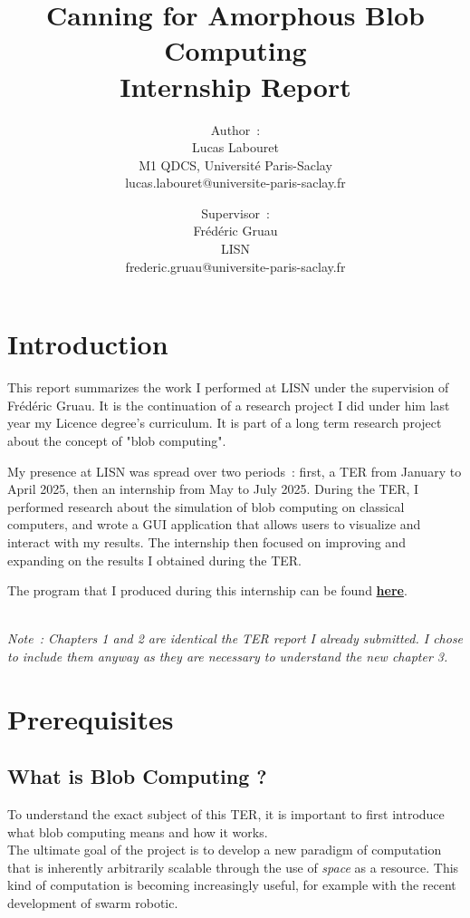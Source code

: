 \documentclass{report}
\title{
	Canning for Amorphous Blob Computing\\
	\small Internship Report
}
\author{
    Author~:\\
    Lucas Labouret\\
    M1 QDCS, Université Paris-Saclay\\
    \small lucas.labouret@universite-paris-saclay.fr
    \and
    Supervisor~:\\
    Frédéric Gruau\\
    LISN\\
    \small frederic.gruau@universite-paris-saclay.fr
}
\date{}
\begin{document}
 
\maketitle

\newpage
\tableofcontents
\newpage

\chapter*{Introduction}
\label{introduction}

This report summarizes the work I performed at LISN under the supervision of Frédéric Gruau. It is the continuation of a research project I did under him last year  my Licence degree's curriculum. It is part of a long term research project about the concept of "blob computing"\supercite{blob_computing1}. 

My presence at LISN was spread over two periods~: first, a TER from January to April 2025, then an internship from May to July 2025.
During the TER, I performed research about the simulation of blob computing on classical computers, and wrote a GUI application that allows users to visualize and interact with my results.
The internship then focused on improving and expanding on the results I obtained during the TER.

The program that I produced during this internship can be found \href{https://github.com/Lucas-Labouret/MilieuCalcul}{\textbf{here}}.

$ $\\
\small\textit{Note~: Chapters 1 and 2 are identical the TER report I already submitted. I chose to include them anyway as they are necessary to understand the new chapter 3.}

\chapter{Prerequisites}

\section{What is Blob Computing ?}

To understand the exact subject of this TER, it is important to first introduce what blob computing means and how it works.\\

The ultimate goal of the project is to develop a new paradigm of computation that is inherently arbitrarily scalable through the use of \textit{space} as a resource. This kind of computation is becoming increasingly useful, for example with the recent development of swarm robotic\supercite{swarm_robotic}.
\end{document}
